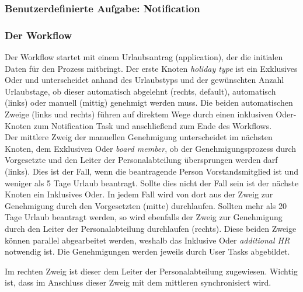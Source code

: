 \subsubsection{Benutzerdefinierte Aufgabe: Notification}

\subsubsection{Der Workflow}
Der Workflow startet mit einem Urlaubsantrag (application), der die initialen Daten für den Prozess mitbringt. Der erste Knoten \textit{holiday type} ist ein Exklusives Oder und unterscheidet anhand des Urlaubstyps und der gewünschten Anzahl Urlaubstage, ob dieser automatisch abgelehnt (rechts, default), automatisch (links) oder manuell (mittig) genehmigt werden muss. Die beiden automatischen Zweige (links und rechts) führen auf direktem Wege durch einen inklusiven Oder-Knoten zum Notification Task und anschließend zum Ende des Workflows.\\
Der mittlere Zweig der manuellen Genehmigung unterscheidet im nächsten Knoten, dem Exklusiven Oder \textit{board member}, ob der Genehmigungsprozess durch Vorgesetzte und den Leiter der Personalabteilung übersprungen werden darf (links). Dies ist der Fall, wenn die beantragende Person Vorstandsmitglied ist und weniger als 5 Tage Urlaub beantragt. Sollte dies nicht der Fall sein ist der nächste Knoten ein Inklusives Oder. In jedem Fall wird von dort aus der Zweig zur Genehmigung durch den Vorgesetzten (mitte) durchlaufen. Sollten mehr als 20 Tage Urlaub beantragt werden, so wird ebenfalls der Zweig zur Genehmigung durch den Leiter der Personalabteilung durchlaufen (rechts). Diese beiden Zweige können parallel abgearbeitet werden, weshalb das Inklusive Oder \textit{additional HR} notwendig ist. Die Genehmigungen werden jeweils durch User Tasks abgebildet.

Im rechten Zweig ist dieser dem Leiter der Personalabteilung zugewiesen. Wichtig ist, dass im Anschluss dieser Zweig mit dem mittleren synchronisiert wird.

